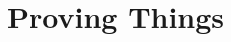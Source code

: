 \documentclass[sequent-calculus]{subfiles}
\begin{document}
\section{Proving Things}

\end{document}
